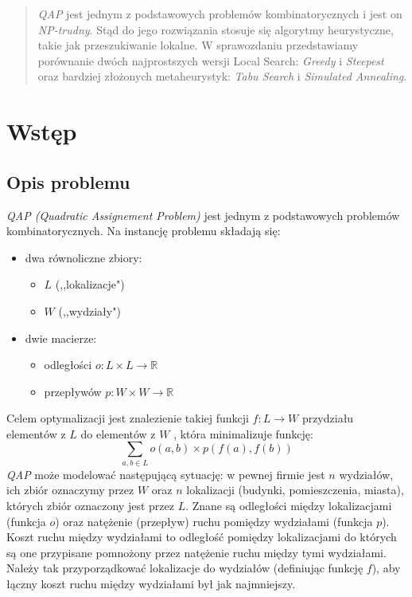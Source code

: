 \documentclass{article}
\begin{document}


\begin{abstract}
\emph{QAP} jest jednym z podstawowych problemów kombinatorycznych i jest on \emph{NP-trudny}. Stąd do jego rozwiązania stosuje się algorytmy heurystyczne, takie jak przeszukiwanie lokalne. W sprawozdaniu przedstawiamy porównanie dwóch najprostszych wersji Local Search: \emph{Greedy} i \emph{Steepest} oraz bardziej złożonych metaheurystyk: \emph{Tabu Search} i  \emph{Simulated Annealing}.
\end{abstract}


\section{Wstęp}
	\subsection{Opis problemu}
	\emph{\emph{QAP} (Quadratic Assignement Problem)} jest jednym z podstawowych problemów kombinatorycznych. Na instancję problemu składają się:
	\begin{itemize}
		\item{dwa równoliczne zbiory:
			\begin{itemize}
				\item{ $L$ (,,lokalizacje")}
				\item{ $W$ (,,wydziały") }
			\end{itemize}
			}
		\item{dwie macierze:
			\begin{itemize}
				\item{ odległości $o:  L \times L \rightarrow \mathbb{R} $}
				\item{ przepływów $p: W \times W \rightarrow \mathbb{R} $}
			\end{itemize}}
	\end{itemize}
		Celem optymalizacji jest znalezienie takiej funkcji $ f: L \rightarrow W $  przydziału elementów z $L$ do elementów z $W$ , która minimalizuje funkcję:
	$$\sum_{a,b \in L}o(a,b)\times p(f(a),f(b))$$
	\emph{QAP} może modelować następującą sytuację: w pewnej firmie jest $n$ wydziałów, ich zbiór oznaczymy przez $W$ oraz $n$ lokalizacji (budynki, pomieszczenia, miasta), których zbiór oznaczony jest przez $L$. Znane są odległości między lokalizacjami (funkcja $o$) oraz natężenie (przepływ) ruchu pomiędzy wydziałami (funkcja $p$). Koszt ruchu między wydziałami to odległość pomiędzy lokalizacjami do których są one przypisane pomnożony przez natężenie ruchu między tymi wydziałami. Należy tak przyporządkować lokalizacje do wydziałów (definiując funkcję $f$), aby łączny koszt ruchu między wydziałami był jak najmniejszy.
\end{document}
